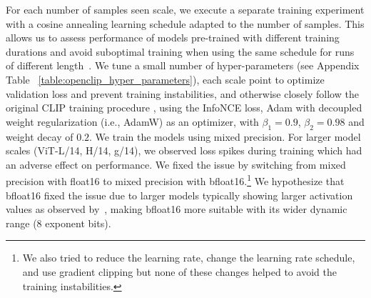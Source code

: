 \documentclass[11pt,table]{article}
\newcommand{\citep}{\cite}
\begin{document}
For each number of samples seen scale, we execute a separate training experiment with a cosine annealing learning schedule adapted to the number of samples. This allows us to assess performance of models pre-trained with different training durations and avoid suboptimal training when using the same schedule for runs of different length~\citep{hoffmann2022training}. We tune a small number of hyper-parameters (see Appendix Table ~\ref{table:openclip_hyper_parameters}), each scale point to optimize validation loss and prevent training instabilities, and otherwise closely follow the original CLIP training procedure \citep{radford2021learning}, using the InfoNCE loss, Adam with decoupled weight regularization \citep{loshchilov2018decoupled} (i.e., AdamW) as an optimizer, with $\beta_1=0.9$, $\beta_2=0.98$ and weight decay of $0.2$.
We train the models using mixed precision.
For larger model scales (ViT-L/14, H/14, g/14), we observed loss spikes during training which had an adverse effect on performance. We fixed the issue by switching from mixed precision with float16 to mixed precision with bfloat16.\footnote{We also tried to reduce the learning rate, change the learning rate schedule, and use gradient clipping but none of these changes helped to avoid the training instabilities.} We hypothesize that bfloat16 fixed the issue due to larger models typically showing larger activation values as observed by~\cite{dettmers2022llm}, making bfloat16 more suitable with its wider dynamic range (8 exponent bits). %

\end{document}
